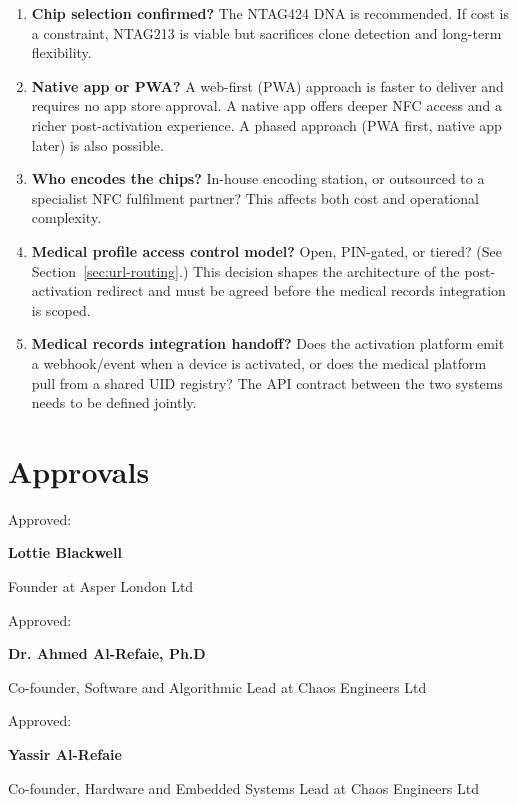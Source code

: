 \documentclass[
	a4paper, %
]{ChaosEngineReport}
\newcommand{\signature}[3]{%
    \vspace{15mm}
    Approved: \hrulefill
    
    \hspace*{0mm}\phantom{Approved: }\textbf{#1}
    
    \hspace*{0mm}\phantom{Approved: }#2 at #3
}
\begin{document}
\begin{enumerate}
  \item \textbf{Chip selection confirmed?} The NTAG424 DNA is recommended. If cost is a constraint, NTAG213 is viable but sacrifices clone detection and long-term flexibility.

  \item \textbf{Native app or PWA?} A web-first (PWA) approach is faster to deliver and requires no app store approval. A native app offers deeper NFC access and a richer post-activation experience. A phased approach (PWA first, native app later) is also possible.

  \item \textbf{Who encodes the chips?} In-house encoding station, or outsourced to a specialist NFC fulfilment partner? This affects both cost and operational complexity.

  \item \textbf{Medical profile access control model?} Open, PIN-gated, or tiered? (See Section~\ref{sec:url-routing}.) This decision shapes the architecture of the post-activation redirect and must be agreed before the medical records integration is scoped.

  \item \textbf{Medical records integration handoff?} Does the activation platform emit a webhook/event when a device is activated, or does the medical platform pull from a shared UID registry? The API contract between the two systems needs to be defined jointly.

\end{enumerate}

\newpage
\section{Approvals}

\signature{Lottie Blackwell}{Founder}{Asper London Ltd}

\signature{Dr. Ahmed Al-Refaie, Ph.D}{Co-founder, Software and Algorithmic Lead}{Chaos Engineers Ltd}

\signature{Yassir Al-Refaie}{Co-founder, Hardware and Embedded Systems Lead}{Chaos Engineers Ltd}



\vfill %
\begingroup
	\footnotesize %
	
\end{document}
